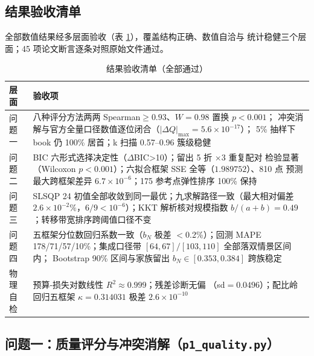 \subsection{结果验收清单}

全部数值结果经多层面验收（表 \ref{tab:verify}），覆盖结构正确、数值自洽与
统计稳健三个层面；45 项论文断言逐条对照原始文件通过。

\begin{table}[htbp]
\centering
\caption{结果验收清单（全部通过）}
\label{tab:verify}
\small
\begin{tabular}{>{\raggedright\arraybackslash}p{1.7cm}|>{\raggedright\arraybackslash}p{10.4cm}}
\toprule
层面 & 验收项 \\
\midrule
问题一 & 八种评分方法两两 Spearman$\ge0.93$、$W=0.98$ 置换 $p<0.001$；
冲突消解与官方全量口径数值逐位闭合（$|\Delta Q|_{\max}=5.6\times10^{-17}$）；
5\% 抽样下 book 仍 100\% 居首；k 扫描 0.57--0.96 簇级稳健 \\
问题二 & BIC 六形式选择决定性（$\Delta$BIC>10）；留出 5 折 $\times$3 重复配对
检验显著（Wilcoxon $p<0.001$）；六拟合框架 SSE 全等（$1.989752$）、810 点
预测最大跨框架差异 $6.7\times10^{-6}$；175 参考点弹性排序 100\% 保持 \\
问题三 & SLSQP 24 初值全部收敛到同一最优；九求解路径一致（最大相对偏差
$2.6\times10^{-2}\%$，$6/9<10^{-6}$）；KKT 解析核对规模指数
$b/(a+b)=0.49$；转移带宽排序跨阈值口径不变 \\
问题四 & 五框架分位数回归系数一致（$b_N$ 极差 $<$0.2\%）；回测 MAPE
178/71/57/10\%；集成口径带 $[64,67]/[103,110]$ 全部落双情景区间内；
Bootstrap 90\% 区间与家族留出 $b_N\in[0.353,0.384]$ 跨族稳定 \\
物理自检 & 预算-损失对数线性 $R^2\approx0.999$；残差诊断无偏
（sd$=0.0496$）；配比岭回归五框架 $\kappa=0.314031$ 极差 $2.6\times10^{-10}$ \\
\bottomrule
\end{tabular}
\end{table}

\subsection{问题一：质量评分与冲突消解（\texttt{p1\_quality.py}）}

